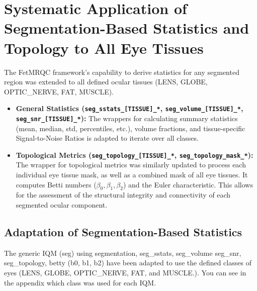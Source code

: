\section{Systematic Application of Segmentation-Based Statistics and Topology to All Eye Tissues}
\label{sec:systematic_seg_iqms}
The FetMRQC framework's capability to derive statistics for any segmented region was extended to all defined ocular tissues (LENS, GLOBE, OPTIC\_NERVE, FAT, MUSCLE).

\begin{itemize}
    \item \textbf{General Statistics (\texttt{seg\_sstats\_[TISSUE]\_*}, \texttt{seg\_volume\_[TISSUE]\_*}, \texttt{seg\_snr\_[TISSUE]\_*}):} The wrappers for calculating summary statistics (mean, median, std, percentiles, etc.), volume fractions, and tissue-specific Signal-to-Noise Ratios is adapted to iterate over all classes.

    \item \textbf{Topological Metrics (\texttt{seg\_topology\_[TISSUE]\_*}, \texttt{seg\_topology\_mask\_*}):} The wrapper for topological metrics was similarly updated to process each individual eye tissue mask, as well as a combined mask of all eye tissues. It computes Betti numbers ($\beta_0, \beta_1, \beta_2$) and the Euler characteristic. This allows for the assessment of the structural integrity and connectivity of each segmented ocular component.
\end{itemize}

\subsection{Adaptation of Segmentation-Based Statistics}
The generic IQM (seg) using segmentation, seg\_sstats, seg\_volume seg\_snr, seg\_topology, betty (b0, b1, b2) have been adapted to use the defined classes of eyes (LENS, GLOBE, OPTIC\_NERVE, FAT, and MUSCLE.). You can see in the appendix which class was used for each IQM.

